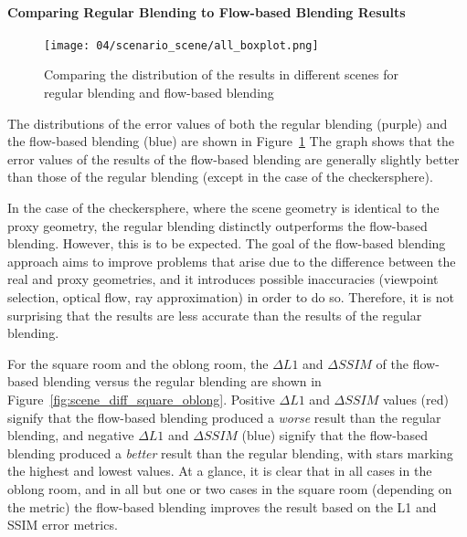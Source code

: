 \paragraph{Comparing Regular Blending to Flow-based Blending Results}

\begin{figure}
		\centering
		\texttt{[image: 04/scenario\_scene/all\_boxplot.png]}
		\caption[The distribution of results in different scenes]{Comparing the distribution of the results in different scenes for regular blending and flow-based blending}
		\label{fig:scenario_scene_boxplot}
\end{figure}

The distributions of the error values of both the regular blending (purple) and the flow-based blending (blue) are shown in Figure~\ref{fig:scenario_scene_boxplot} The graph shows that the error values of the results of the flow-based blending are generally slightly better than those of the regular blending (except in the case of the checkersphere). 

In the case of the checkersphere, where the scene geometry is identical to the proxy geometry, the regular blending distinctly outperforms the flow-based blending. However, this is to be expected. The goal of the flow-based blending approach aims to improve problems that arise due to the difference between the real and proxy geometries, and it introduces possible inaccuracies (viewpoint selection, optical flow, ray approximation) in order to do so. Therefore, it is not surprising that the results are less accurate than the results of the regular blending.

For the square room and the oblong room, the $\Delta L1$ and $\Delta SSIM$ of the flow-based blending versus the regular blending are shown in Figure~\ref{fig:scene_diff_square_oblong}. Positive $\Delta L1$ and $\Delta SSIM$ values (red) signify that the flow-based blending produced a \emph{worse} result than the regular blending, and negative $\Delta L1$ and $\Delta SSIM$ (blue) signify that the flow-based blending produced a \emph{better} result than the regular blending, with stars marking the highest and lowest values. At a glance, it is clear that in all cases in the oblong room, and in all but one or two cases in the square room (depending on the metric) the flow-based blending improves the result based on the L1 and SSIM error metrics.

